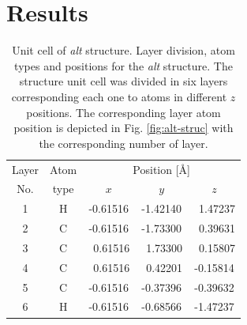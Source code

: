 \documentclass[prb,11pt,tightenlines,twocolumn,aps]{revtex4-1}
\begin{document}

\section{Results} %
\label{sec:results}

\begin{table}[t]
\center
\begin{tabular}{ccccc}\\
\hline
\quad Layer \quad & \quad Atom \qquad & \multicolumn{3}{c}{Position [\AA]} \\
\cline{3-5}
\quad No.   \quad & \quad type \qquad & $x$ & $y$ & $z$  \\
\hline
1 & H &  -0.61516 &  -1.42140 & \ 1.47237 \\
2 & C &  -0.61516 &  -1.73300 & \ 0.39631 \\
3 & C & \ 0.61516 & \ 1.73300 & \ 0.15807 \\
4 & C & \ 0.61516 & \ 0.42201 &  -0.15814 \\
5 & C &  -0.61516 &  -0.37396 &  -0.39632 \\
6 & H &  -0.61516 &  -0.68566 &  -1.47237 \\
\hline
\end{tabular}

\caption{Unit cell of \emph{alt} structure. Layer division, atom types and
positions for the \emph{alt} structure. The structure unit cell was divided in
six layers corresponding each one to atoms in different $z$ positions. The
corresponding layer atom position is depicted in Fig. \ref{fig:alt-struc} with
the corresponding number of layer.}
\label{tab:alt-unitcell}
\end{table}
% 
\end{document}

